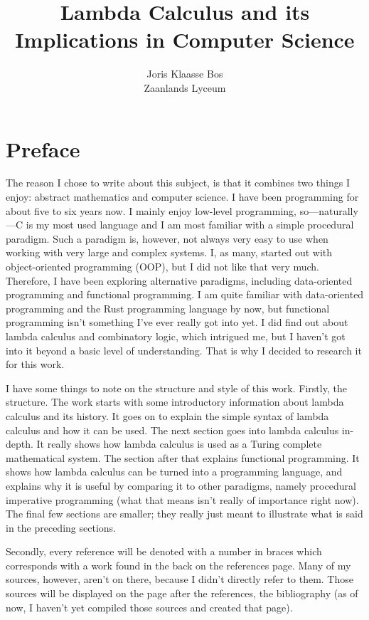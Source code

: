 \documentclass[11pt]{article}
\title{Lambda Calculus and its Implications in Computer Science}
\author{Joris Klaasse Bos\\ Zaanlands Lyceum}
\begin{document}
\maketitle
\newpage

\section*{Preface}


The reason I chose to write about this subject, is that it combines two things
I enjoy: abstract mathematics and computer science. I have been programming for
about five to six years now. I mainly enjoy low-level programming,
so---naturally---C is my most used language and I am most familiar with a
simple procedural paradigm. Such a paradigm is, however, not always very easy
to use when working with very large and complex systems. I, as many, started
out with object-oriented programming (OOP), but I did not like that very much.
Therefore, I have been exploring alternative paradigms, including data-oriented
programming and functional programming. I am quite familiar with data-oriented
programming and the Rust programming language by now, but functional
programming isn't something I've ever really got into yet. I did find out about
lambda calculus and combinatory logic, which intrigued me, but I haven’t got
into it beyond a basic level of understanding. That is why I decided to
research it for this work. 

I have some things to note on the structure and style of this work. Firstly,
the structure. The work starts with some introductory information about lambda
calculus and its history. It goes on to explain the simple syntax of lambda
calculus and how it can be used. The next section goes into lambda calculus
in-depth. It really shows how lambda calculus is used as a Turing complete
mathematical system. The section after that explains functional programming. It
shows how lambda calculus can be turned into a programming language, and
explains why it is useful by comparing it to other paradigms, namely procedural
imperative programming (what that means isn't really of importance right now).
The final few sections are smaller; they really just meant to illustrate what
is said in the preceding sections.

Secondly, every reference will be denoted with a number in braces which
corresponds with a work found in the back on the references page. Many of my
sources, however, aren't on there, because I didn't directly refer to them.
Those sources will be displayed on the page after the references, the
bibliography (as of now, I haven't yet compiled those sources and created that
page).
\end{document}
